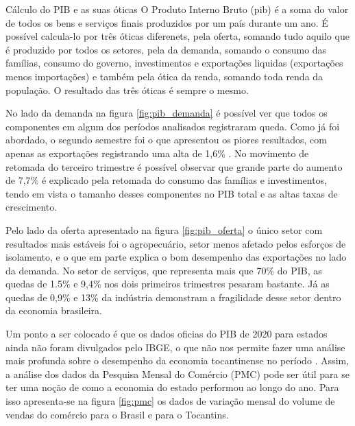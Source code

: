 \begin{smbox}[label={labelbox},nameref={Cálculo do PIB e as suas óticas}]{Cálculo do PIB e as suas óticas}
	O Produto Interno Bruto (\acrshort{pib}) é a soma do valor de todos os bens e serviços finais produzidos por um país durante um ano. É possível calcula-lo por três óticas diferenets, pela oferta, somando tudo aquilo que é produzido por todos os setores, pela da demanda, somando o consumo das famílias, consumo do governo, investimentos e exportações liquidas (exportações menos importações) e também pela ótica da renda, somando toda renda da população. O resultado das três óticas é sempre o mesmo.
\end{smbox}
\par No lado da demanda na figura \ref{fig:pib_demanda} é possível ver que todos os componentes em algum dos períodos analisados registraram queda. Como já foi abordado, o segundo semestre foi o que apresentou os piores resultados, com apenas as exportações registrando uma alta de 1,6\% . No movimento de retomada do terceiro trimestre é possível observar que grande parte do aumento de 7,7\% é explicado pela retomada do consumo das famílias e investimentos, tendo em vista o tamanho desses componentes no PIB total e as altas taxas de crescimento.
\par Pelo lado da oferta apresentado na figura \ref{fig:pib_oferta} o único setor com resultados mais estáveis foi o agropecuário, setor menos afetado pelos esforços de isolamento, e o que em parte explica o bom desempenho das exportações no lado da demanda. No setor de serviços, que representa mais que 70\% do PIB, as quedas de 1.5\% e 9,4\% nos dois primeiros trimestres pesaram bastante. Já as quedas de 0,9\% e 13\% da indústria demonstram a fragilidade desse setor dentro da economia brasileira.
\par Um ponto a ser colocado é que os dados oficias do PIB de 2020 para estados ainda não foram divulgados pelo IBGE, o que não nos permite fazer uma análise mais profunda sobre o desempenho da economia tocantinense no período . Assim, a análise dos dados da Pesquisa Mensal do Comércio (PMC) pode ser útil para se ter uma noção de como a economia do estado performou ao longo do ano. Para isso apresenta-se na figura \ref{fig:pmc} os dados de variação mensal do volume de vendas do comércio para o Brasil e para o Tocantins.

